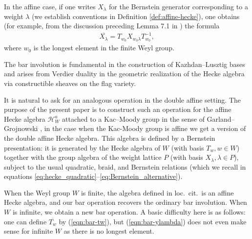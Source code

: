 \documentclass{amsart}
\theoremstyle{definition}
\numberwithin{equation}{section}
\begin{document}
In the affine case, if one writes $X_\lambda$ for the Bernstein generator corresponding to a weight $\lambda$ (we establish conventions in Definition \ref{def:affine-hecke}), one obtains (for example, from the discussion preceding Lemma 7.1 in \cite{L83}) the formula
\begin{align}
\overline{X_{\lambda}} = T_{w_0}X_{w_0\lambda} T_{w_0}^{-1},\label{eqn:bar-ylambda}
\end{align}
{ where $w_0$ is the longest element in the finite Weyl group.}

The bar involution is fundamental in the construction of Kazhdan--Lusztig bases and arises from Verdier duality in the geometric realization of the Hecke algebra via constructible sheaves on the flag variety. 

It is natural to ask for an analogous operation in the double affine setting.
The purpose of the present paper is to construct such an operation for the affine Hecke algebra $\mathcal{H}_W^a$ attached to a Kac--Moody group in the sense of Garland--Grojnowski \cite{GG}, in the case when the Kac-Moody group is affine we get a version of the double affine Hecke algebra. This algebra is defined by a Bernstein presentation: it is generated by the Hecke algebra of $W$ { (with basis $T_w, w\in W$)} together with the group algebra of the weight lattice { $P$ (with basis $X_\lambda, \lambda\in P$)}, subject to the usual quadratic, braid, and Bernstein relations (which we recall in equations \eqref{eq:hecke_quadratic}--\eqref{eq:Bernstein_alternative}). 

When the Weyl group $W$ is finite, the algebra defined in loc.\ cit.\ is an affine Hecke algebra, and our bar operation recovers the ordinary bar involution. { When $W$ is infinite, we obtain a new bar operation. A basic difficulty here is as follows: one can define $\overline{T_w}$ by (\ref{eqn:bar-tw}), but
(\ref{eqn:bar-ylambda}) does not even make sense for infinite $W$ as there is no longest element.}

\end{document}
